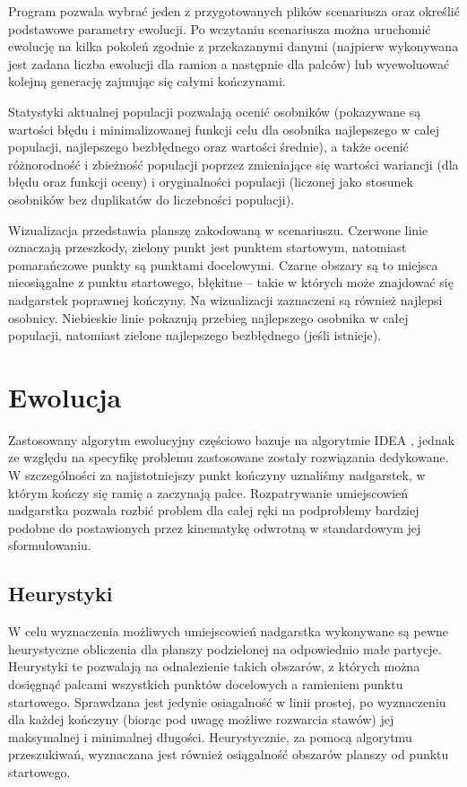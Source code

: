\documentclass[11pt, leqno]{article}
\begin{document}
Program pozwala wybrać jeden z przygotowanych plików scenariusza oraz określić podstawowe parametry ewolucji. Po wczytaniu scenariusza można uruchomić ewolucję na kilka pokoleń zgodnie z przekazanymi danymi (najpierw wykonywana jest zadana liczba ewolucji dla ramion a następnie dla palców) lub wyewoluować kolejną generację zajmując się całymi kończynami.

Statystyki aktualnej populacji pozwalają ocenić osobników (pokazywane są wartości błędu i minimalizowanej funkcji celu dla osobnika najlepszego w calej populacji, najlepszego bezbłędnego oraz wartości średnie), a także ocenić różnorodność i zbieżność populacji poprzez zmieniające się wartości wariancji (dla błędu oraz funkcji oceny) i oryginalności populacji (liczonej jako stosunek osobników bez duplikatów do liczebności populacji).

Wizualizacja przedstawia planszę zakodowaną w scenariuszu. Czerwone linie oznaczają przeszkody, zielony punkt jest punktem startowym, natomiast pomarańczowe punkty są punktami docelowymi. Czarne obszary są to miejsca nieosiągalne z punktu startowego, błękitne -- takie w których może znajdować się nadgarstek poprawnej kończyny. Na wizualizacji zaznaczeni są również najlepsi osobnicy. Niebieskie linie pokazują przebieg najlepszego osobnika w całej populacji, natomiast zielone najlepszego bezbłędnego (jeśli istnieje).

\section{Ewolucja}
Zastosowany algorytm ewolucyjny częściowo bazuje na algorytmie IDEA \cite{PFI}, jednak ze względu na specyfikę problemu zastosowane zostały rozwiązania dedykowane. W szczególności za najistotniejszy punkt kończyny uznaliśmy nadgarstek, w którym kończy się ramię a zaczynają palce. Rozpatrywanie umiejscowień nadgarstka pozwala rozbić problem dla całej ręki na podproblemy bardziej podobne do postawionych przez kinematykę odwrotną w standardowym jej sformułowaniu. 

\subsection{Heurystyki}
W celu wyznaczenia możliwych umiejscowień nadgarstka wykonywane są pewne heurystyczne obliczenia dla planszy podzielonej na odpowiednio małe partycje. Heurystyki te pozwalają na odnalezienie takich obszarów, z których można dosięgnąć palcami wszystkich punktów docelowych a ramieniem punktu startowego. Sprawdzana jest jedynie osiagalność w linii prostej, po wyznaczeniu dla każdej kończyny (biorąc pod uwagę możliwe rozwarcia stawów) jej maksymalnej i minimalnej długości. Heurystycznie, za pomocą algorytmu przeszukiwań, wyznaczana jest również osiągalność obszarów planszy od punktu startowego.
\end{document}
